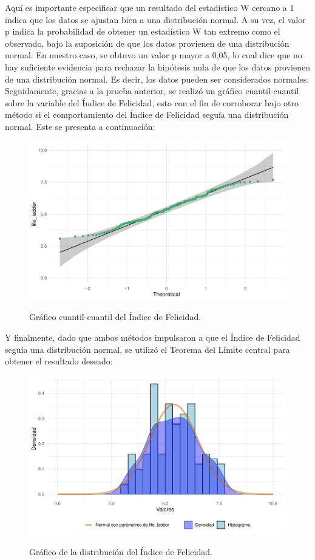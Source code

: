 Aquí es importante especificar que un resultado del estadístico W cercano a 1 indica que los datos se ajustan bien a una distribución normal. A su vez, el valor p indica la probabilidad de obtener un estadístico W tan extremo como el observado, bajo la suposición de que los datos provienen de una distribución normal. En nuestro caso, se obtuvo un valor p mayor a 0,05, lo cual dice que no hay suficiente evidencia para rechazar la hipótesis nula de que los datos provienen de una distribución normal. Es decir, los datos pueden ser considerados normales. \\

Seguidamente, gracias a la prueba anterior, se realizó un gráfico cuantil-cuantil sobre la variable del Índice de Felicidad, esto con el fin de corroborar bajo otro método si el comportamiento del Índice de Felicidad seguía una distribución normal. Este se presenta a continuación:

\begin{figure}[H]
    \centering
    \caption{Gráfico cuantil-cuantil del Índice de Felicidad.}
    \includegraphics[width=12cm]{figures/qqp_life.pdf}
    \label{fig:qqp_life}
\end{figure}

Y finalmente, dado que ambos métodos impulsaron a que el Índice de Felicidad seguía una distribución normal, se utilizó el Teorema del Límite central para obtener el resultado deseado:

\begin{figure}[H]
    \centering
    \caption{Gráfico de la distribución del Índice de Felicidad.}
    \includegraphics[width=12cm]{figures/life_ladder.pdf}
    \label{fig:qqp_life}
\end{figure}

